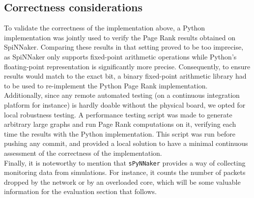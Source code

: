 \subsection{Correctness considerations} \label{sec:resval}


To validate the correctness of the implementation above, a Python implementation was jointly used to verify the Page Rank results obtained on SpiNNaker. Comparing these results in that setting proved to be too imprecise, as SpiNNaker only supports fixed-point arithmetic operations while Python's floating-point representation is significantly more precise. Consequently, to ensure results would match to the exact bit, a binary fixed-point arithmetic library had to be used to re-implement the Python Page Rank implementation. \\

Additionally, since any remote automated testing (on a continuous integration platform for instance) is hardly doable without the physical board, we opted for local robustness testing. A performance testing script was made to generate arbitrary large graphs and run Page Rank computations on it, verifying each time the results with the Python implementation. This script was run before pushing any commit, and provided a local solution to have a minimal continuous assessment of the correctness of the implementation. \\

Finally, it is noteworthy to mention that \texttt{sPyNNaker} provides a way of collecting monitoring data from simulations. For instance, it counts the number of packets dropped by the network or by an overloaded core, which will be some valuable information for the evaluation section that follows.
